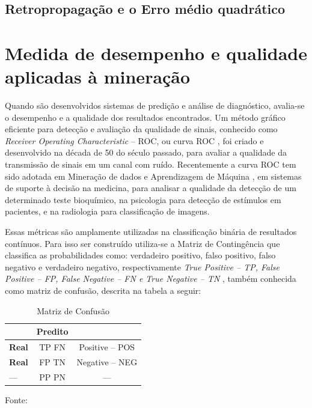 \subsection{Retropropagação e o Erro médio quadrático}



\section{Medida de desempenho e qualidade aplicadas à mineração}

Quando são desenvolvidos sistemas de predição e análise de diagnóstico, avalia-se o desempenho e a qualidade dos resultados encontrados.
Um método gráfico eficiente para detecção e avaliação da qualidade de sinais, conhecido como \textit{Receiver Operating Characteristic} -- ROC, ou curva ROC \cite{ROC},
foi criado e desenvolvido na década de 50 do século passado, para avaliar a qualidade da transmissão de sinais em um canal com ruído.
Recentemente a curva ROC tem sido adotada em Mineração de dados e Aprendizagem de Máquina \cite{MD_AM}, em sistemas de suporte à decisão na medicina, para analisar a qualidade da detecção 
de um determinado teste bioquímico, na psicologia para detecção de estímulos \cite{Discriminativo} em pacientes, e na radiologia para classificação de imagens.

Essas métricas são amplamente utilizadas na classificação binária de resultados contínuos. Para isso ser construído utiliza-se a Matriz de Contingência que classifica as probabilidades como:
verdadeiro positivo, falso positivo, falso negativo e verdadeiro negativo, respectivamente \textit{True Positive -- TP, False Positive -- FP, False Negative -- FN e True Negative -- TN },
também conhecida como matriz de confusão, descrita na tabela a seguir:

\begin{table}[ht]
\centering
\caption{Matriz de Confusão}
\vspace{1mm}
\begin{tabular}{l|c|c}
\hline
\textbf{} & \textbf{Predito} & \textbf{}\\
\hline
\textbf{Real}  & TP   FN & Positive -- POS\\
\textbf{Real}  & FP   TN & Negative -- NEG\\
\hline
   ---         & PP   PN &    ---         \\
\end{tabular}
\tiny Fonte: \cite{Bradley1997}
\end{table}

